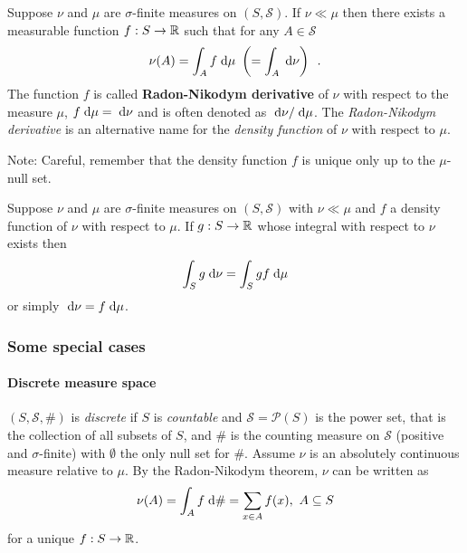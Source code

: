 \begin{theorem}\label{thepre:RadonNikodym}
Suppose $\nu$ and $\mu$ are $\sigma$-finite measures on $(S, \mathscr{S})$. 
If $\nu \ll \mu$ then there exists a measurable function $f : S \to \mathbb{R}$ such that for any $A \in \mathscr{S}$
\begin{equation}
\nu(A) = \int_A f \; \text{d} \mu \ \left( = \int_A \; \text{d} \nu \right) \enspace .
\end{equation}
The function $f$ is called \textbf{Radon-Nikodym derivative} of $\nu$ with respect to the measure $\mu$, $f \; \text{d} \mu = \; \text{d} \nu$ and is often denoted as $\; \text{d} \nu / \; \text{d} \mu$.
The \emph{Radon-Nikodym derivative} is an alternative name for the \emph{density function} of $\nu$ with respect to $\mu$.

Note: Careful, remember that the density function $f$ is unique only up to the $\mu$-null set.
\end{theorem}

\begin{theorem}
Suppose $\nu$ and $\mu$ are $\sigma$-finite measures on $(S, \mathscr{S})$ with $\nu \ll \mu$ and $f$ a density function of $\nu$ with respect to $\mu$.
If $g : S \to \mathbb{R}$ whose integral with respect to $\nu$ exists then 
\begin{equation}\label{eqpre:changeOfVarInt}
\int_S g \; \text{d} \nu = \int_S gf \; \text{d} \mu
\end{equation}
or simply $\; \text{d} \nu = f \; \text{d} \mu$.
\end{theorem}

\subsubsection{Some special cases}

\paragraph{Discrete measure space}
$(S, \mathscr{S}, \#)$ is \emph{discrete} if $S$ is \emph{countable} and $\mathscr{S} = \mathscr{P}(S)$ is the power set, that is the collection of all subsets of $S$, and $\#$ is the counting measure on $\mathscr{S}$ (positive and $\sigma$-finite) with $\emptyset$ the only null set for $\#$.
Assume $\nu$ is an absolutely continuous measure relative to $\mu$. By the Radon-Nikodym theorem, $\nu$ can be written as 
\begin{equation}
\nu(A) = \int_A f \; \text{d} \# = \sum_{x \in A} f(x), \ A \subseteq S 
\end{equation}
for a unique $f : S \to \mathbb{R}$.


